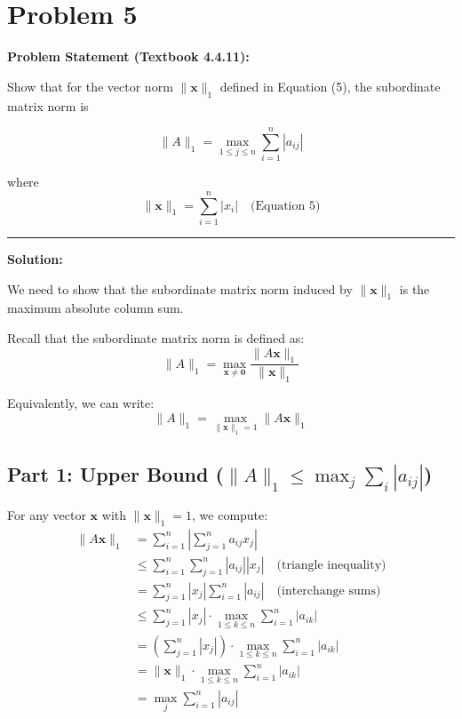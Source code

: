 \clearpage
\section*{Problem 5}

\textbf{Problem Statement (Textbook 4.4.11):} 

Show that for the vector norm $\|\mathbf{x}\|_1$ defined in Equation (5), the subordinate matrix norm is

$$\|A\|_1 = \max_{1 \leq j \leq n} \sum_{i=1}^{n} |a_{ij}|$$

where
$$\|\mathbf{x}\|_1 = \sum_{i=1}^{n} |x_i| \quad \text{(Equation 5)}$$

\noindent\rule{\textwidth}{0.4pt}

\vspace{1em}

\textbf{Solution:}

We need to show that the subordinate matrix norm induced by $\|\mathbf{x}\|_1$ is the maximum absolute column sum.

Recall that the subordinate matrix norm is defined as:
$$\|A\|_1 = \max_{\mathbf{x} \neq \mathbf{0}} \frac{\|A\mathbf{x}\|_1}{\|\mathbf{x}\|_1}$$

Equivalently, we can write:
$$\|A\|_1 = \max_{\|\mathbf{x}\|_1 = 1} \|A\mathbf{x}\|_1$$

\subsection*{Part 1: Upper Bound ($\|A\|_1 \leq \max_j \sum_i |a_{ij}|$)}

For any vector $\mathbf{x}$ with $\|\mathbf{x}\|_1 = 1$, we compute:
\begin{align*}
\|A\mathbf{x}\|_1 &= \sum_{i=1}^{n} \left| \sum_{j=1}^{n} a_{ij} x_j \right| \\
&\leq \sum_{i=1}^{n} \sum_{j=1}^{n} |a_{ij}| |x_j| \quad \text{(triangle inequality)} \\
&= \sum_{j=1}^{n} |x_j| \sum_{i=1}^{n} |a_{ij}| \quad \text{(interchange sums)} \\
&\leq \sum_{j=1}^{n} |x_j| \cdot \max_{1 \leq k \leq n} \sum_{i=1}^{n} |a_{ik}| \\
&= \left(\sum_{j=1}^{n} |x_j|\right) \cdot \max_{1 \leq k \leq n} \sum_{i=1}^{n} |a_{ik}| \\
&= \|\mathbf{x}\|_1 \cdot \max_{1 \leq k \leq n} \sum_{i=1}^{n} |a_{ik}| \\
&= \max_{j} \sum_{i=1}^{n} |a_{ij}|
\end{align*}

